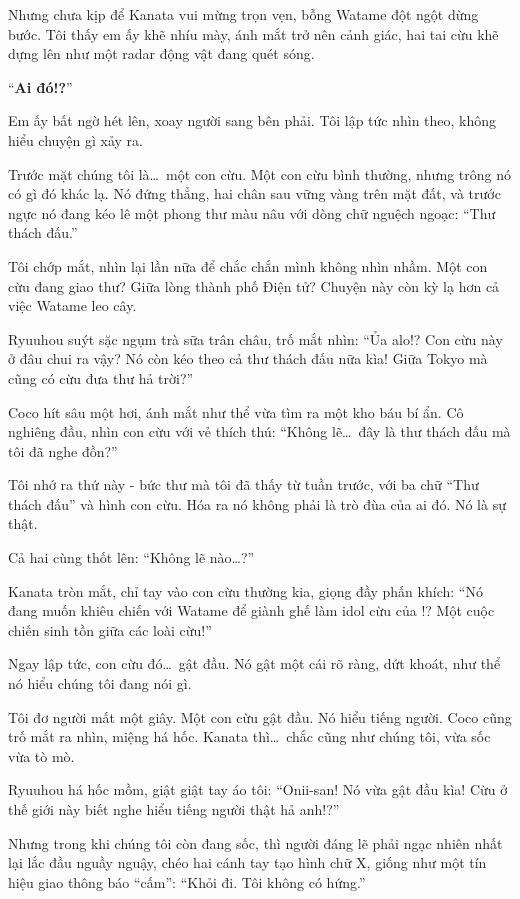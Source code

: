 \documentclass[../main.tex]{subfiles}
\begin{document}
Nhưng chưa kịp để Kanata vui mừng trọn vẹn, bỗng Watame đột ngột dừng bước. Tôi thấy em ấy khẽ nhíu mày, ánh mắt trở nên cảnh giác, hai tai cừu khẽ dựng lên như một radar động vật đang quét sóng.

``\textbf{Ai đó!?}''

Em ấy bất ngờ hét lên, xoay người sang bên phải. Tôi lập tức nhìn theo, không hiểu chuyện gì xảy ra.

Trước mặt chúng tôi là\dots\ một con cừu. Một con cừu bình thường, nhưng trông nó có gì đó khác lạ. Nó đứng thẳng, hai chân sau vững vàng trên mặt đất, và trước ngực nó đang kéo lê một phong thư màu nâu với dòng chữ nguệch ngoạc: ``Thư thách đấu.''


Tôi chớp mắt, nhìn lại lần nữa để chắc chắn mình không nhìn nhầm. Một con cừu đang giao thư? Giữa lòng thành phố Điện tử? Chuyện này còn kỳ lạ hơn cả việc Watame leo cây.

Ryuuhou suýt sặc ngụm trà sữa trân châu, trố mắt nhìn: ``Ủa alo!? Con cừu này ở đâu chui ra vậy? Nó còn kéo theo cả thư thách đấu nữa kìa! Giữa Tokyo mà cũng có cừu đưa thư hả trời?''

Coco hít sâu một hơi, ánh mắt như thể vừa tìm ra một kho báu bí ẩn. Cô nghiêng đầu, nhìn con cừu với vẻ thích thú: ``Không lẽ\dots\ đây là thư thách đấu mà tôi đã nghe đồn?''

Tôi nhớ ra thứ này - bức thư mà tôi đã thấy từ tuần trước, với ba chữ ``Thư thách đấu'' và hình con cừu. Hóa ra nó không phải là trò đùa của ai đó. Nó là sự thật.

Cả hai cùng thốt lên: ``Không lẽ nào\dots?''

Kanata tròn mắt, chỉ tay vào con cừu thường kia, giọng đầy phấn khích: ``Nó đang muốn khiêu chiến với Watame để giành ghế làm idol cừu của \hll!? Một cuộc chiến sinh tồn giữa các loài cừu!''

Ngay lập tức, con cừu đó\dots\ gật đầu. Nó gật một cái rõ ràng, dứt khoát, như thể nó hiểu chúng tôi đang nói gì.

Tôi đơ người mất một giây. Một con cừu gật đầu. Nó hiểu tiếng người. Coco cũng trố mắt ra nhìn, miệng há hốc. Kanata thì\dots\ chắc cũng như chúng tôi, vừa sốc vừa tò mò.

Ryuuhou há hốc mồm, giật giật tay áo tôi: ``Onii-san! Nó vừa gật đầu kìa! Cừu ở thế giới này biết nghe hiểu tiếng người thật hả anh!?''

Nhưng trong khi chúng tôi còn đang sốc, thì người đáng lẽ phải ngạc nhiên nhất lại lắc đầu nguầy nguậy, chéo hai cánh tay tạo hình chữ X, giống như một tín hiệu giao thông báo ``cấm'': ``Khỏi đi. Tôi không có hứng.''
\end{document}
